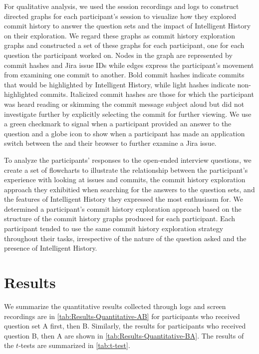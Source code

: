For qualitative analysis, we used the session recordings and logs to construct directed graphs for each participant's session to visualize how they explored commit history to answer the question sets and the impact of Intelligent History on their exploration.
We regard these graphs as commit history exploration graphs and constructed a set of these graphs for each participant, one for each question the participant worked on.
Nodes in the graph are represented by commit hashes and Jira issue IDs while edges express the participant's movement from examining one commit to another.
Bold commit hashes indicate commits that would be highlighted by Intelligent History, while light hashes indicate non-highlighted commits.
Italicized commit hashes are those for which the participant was heard reading or skimming the commit message subject aloud but did not investigate further by explicitly selecting the commit for further viewing.
We use a green checkmark to signal when a participant provided an answer to the question and a globe icon to show when a participant has made an application switch between the  and their browser to further examine a Jira issue.

To analyze the participants' responses to the open-ended interview questions, we create a set of flowcharts to illustrate the relationship between the participant's experience with looking at issues and commits,
the commit history exploration approach they exhibitied when searching for the answers to the question sets, and the features of Intelligent History they expressed the most enthusiasm for.
We determined a participant's commit history exploration approach based on the structure of the commit history graphs produced for each participant.
Each participant tended to use the same commit history exploration strategy throughout their tasks, irrespective of the nature of the question asked and the presence of Intelligent History.

\section{Results}
\label{sec:Results}

We summarize the quantitative results collected through logs and screen recordings are in \autoref{tab:Results-Quantitative-AB} for participants who received question set A first, then B.
Similarly, the results for participants who received question B, then A are shown in \autoref{tab:Results-Quantitative-BA}.
The results of the $t$-tests are summarized in \autoref{tab:t-test}.

